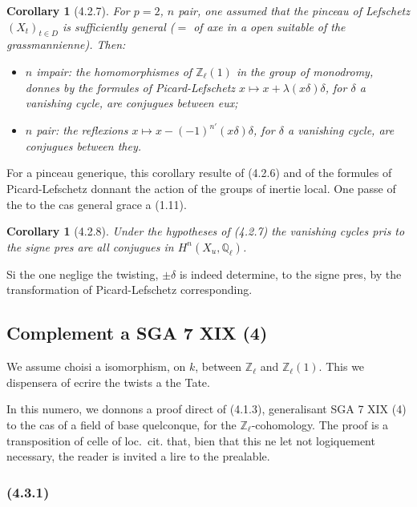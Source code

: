 \documentclass[12pt,a4paper]{article}
\theoremstyle{plain}
\newtheorem{corollary}[theorem]{Corollary}
\theoremstyle{definition}
\theoremstyle{remark}
\newcommand{\Zl}{\mathbb{Z}_\ell}
\newcommand{\Ql}{\mathbb{Q}_\ell}
\begin{document}
\begin{corollary}[4.2.7]
For $p=2$, $n$ pair, one assumed that the pinceau of Lefschetz $(X_t)_{t \in D}$ is sufficiently general ($=$ of axe in a open suitable of the grassmannienne). Then:
\begin{itemize}
\item[(i)] $n$ impair: the homomorphismes of $\Zl(1)$ in the group of monodromy, donnes by the formules of Picard-Lefschetz $x \mapsto x + \lambda(x\delta)\delta$, for $\delta$ a vanishing cycle, are conjugues between eux;
\item[(ii)] $n$ pair: the reflexions $x \mapsto x - (-1)^{n'}(x\delta)\delta$, for $\delta$ a vanishing cycle, are conjugues between they.
\end{itemize}
\end{corollary}

For a pinceau generique, this corollary resulte of (4.2.6) and of the formules of Picard-Lefschetz donnant the action of the groups of inertie local. One passe of the to the cas general grace a (1.11).

\begin{corollary}[4.2.8]
Under the hypotheses of (4.2.7) the vanishing cycles pris to the signe pres are all conjugues in $H^n(X_u, \Ql)$.
\end{corollary}

Si the one neglige the twisting, $\pm \delta$ is indeed determine, to the signe pres, by the transformation of Picard-Lefschetz corresponding.

\subsection{Complement a SGA 7 XIX (4)}

We assume choisi a isomorphism, on $k$, between $\Zl$ and $\Zl(1)$. This we dispensera of ecrire the twists a the Tate.

In this numero, we donnons a proof direct of (4.1.3), generalisant SGA 7 XIX (4) to the cas of a field of base quelconque, for the $\Zl$-cohomology. The proof is a transposition of celle of loc.~cit. that, bien that this ne let not logiquement necessary, the reader is invited a lire to the prealable.

\subsubsection*{\textup{(4.3.1)}}
\end{document}
